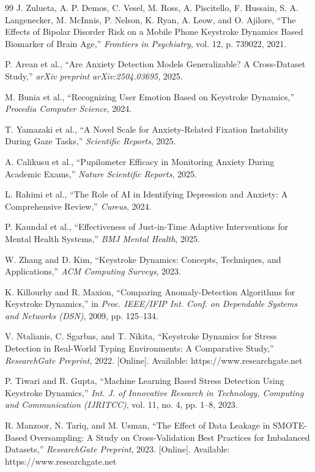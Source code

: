 \documentclass[a4paper,11pt]{report}
\begin{document}
\begin{thebibliography}{99}
 J. Zulueta, A. P. Demos, C. Vesel, M. Ross, A. Piscitello, F. Hussain, S. A. Langenecker, M. McInnis, P. Nelson, K. Ryan, A. Leow, and O. Ajilore, ``The Effects of Bipolar Disorder Risk on a Mobile Phone Keystroke Dynamics Based Biomarker of Brain Age,'' \emph{Frontiers in Psychiatry}, vol. 12, p. 739022, 2021. 

 P. Arean et al., ``Are Anxiety Detection Models Generalizable? A Cross-Dataset Study,'' \emph{arXiv preprint arXiv:2504.03695}, 2025.

 M. Bunia et al., ``Recognizing User Emotion Based on Keystroke Dynamics,'' \emph{Procedia Computer Science}, 2024. 

 T. Yamazaki et al., ``A Novel Scale for Anxiety-Related Fixation Instability During Gaze Tasks,'' \emph{Scientific Reports}, 2025. 

 A. Calikusu et al., ``Pupilometer Efficacy in Monitoring Anxiety During Academic Exams,'' \emph{Nature Scientific Reports}, 2025. 

 L. Rahimi et al., ``The Role of AI in Identifying Depression and Anxiety: A Comprehensive Review,'' \emph{Cureus}, 2024. 

 P. Kaundal et al., ``Effectiveness of Just-in-Time Adaptive Interventions for Mental Health Systems,'' \emph{BMJ Mental Health}, 2025. 

 W. Zhang and D. Kim, ``Keystroke Dynamics: Concepts, Techniques, and Applications,'' \emph{ACM Computing Surveys}, 2023.

 K. Killourhy and R. Maxion, ``Comparing Anomaly-Detection Algorithms for Keystroke Dynamics,'' in \emph{Proc. IEEE/IFIP Int. Conf. on Dependable Systems and Networks (DSN)}, 2009, pp. 125--134.

 V. Ntalianis, C. Sgarbas, and T. Nikita, ``Keystroke Dynamics for Stress Detection in Real-World Typing Environments: A Comparative Study,'' \emph{ResearchGate Preprint}, 2022. [Online]. Available: https://www.researchgate.net

 P. Tiwari and R. Gupta, ``Machine Learning Based Stress Detection Using Keystroke Dynamics,'' \emph{Int. J. of Innovative Research in Technology, Computing and Communication (IJRITCC)}, vol. 11, no. 4, pp. 1--8, 2023.

 R. Manzoor, N. Tariq, and M. Usman, ``The Effect of Data Leakage in SMOTE-Based Oversampling: A Study on Cross-Validation Best Practices for Imbalanced Datasets,'' \emph{ResearchGate Preprint}, 2023. [Online]. Available: https://www.researchgate.net

\end{thebibliography}

\printindex
\end{document}
